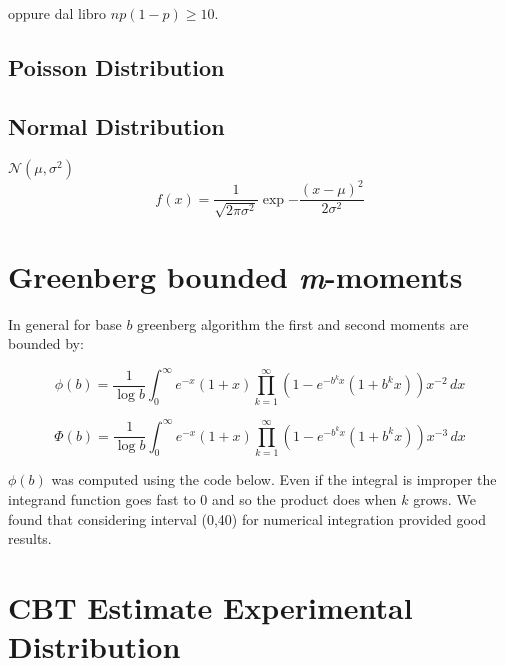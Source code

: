\begin{appendices}
oppure dal libro $np(1-p)\geq 10$.




\subsection{Poisson Distribution}

\subsection{Normal Distribution}

 $\mathcal{N}(\mu,\sigma^{2})$
\begin{equation}
f(x)= \frac{1}{\sqrt{2\pi\sigma^{2}}}\exp{-\frac{(x-\mu)^{2}}{2\sigma^{2}}}
\end{equation}

\section{Greenberg bounded \emph{m}-moments}
\label{sec:greenberg-moments}
In general for base $b$ greenberg algorithm the first and second moments are bounded by:

\begin{equation}
\phi(b)= \frac{1}{\log b} \int_{0}^{\infty} \! e^{-x}(1+x) \prod_{k=1}^{\infty}(1-e^{-b^{k}x}(1+b^{k}x))x^{-2} \, dx
\label{eq:greenberg-b-phi}
\end{equation}

\begin{equation}
\Phi(b)= \frac{1}{\log b} \int_{0}^{\infty} \! e^{-x}(1+x) \prod_{k=1}^{\infty}(1-e^{-b^{k}x}(1+b^{k}x))x^{-3} \, dx
\label{eq:greenberg-b-Phi}
\end{equation}

\noindent $\phi(b)$ was computed using the code below. Even if the integral is improper the integrand function goes fast to 0 and so the product does when $k$ grows. We found that considering interval (0,40) for numerical integration provided good results.\\






\section{CBT Estimate Experimental Distribution}


\end{appendices}
